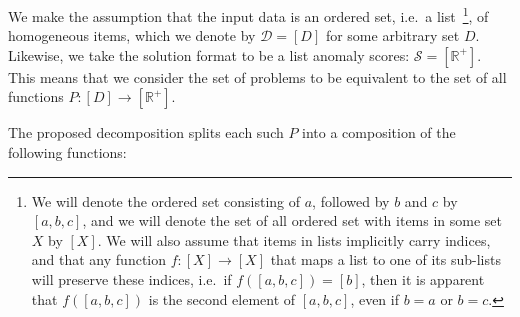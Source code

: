 We make the assumption that the input data is an ordered set, i.e.\ a list~\footnote{We will denote the ordered set consisting of $a$, followed by $b$ and $c$ by $[a, b, c]$, and we will denote the set of all ordered set with items in some set $X$ by $[X]$. We will also assume that items in lists implicitly carry indices, and that any function $f: [X] \rightarrow [X]$ that maps a list to one of its sub-lists will preserve these indices, i.e.\ if $f([a, b, c]) = [b]$, then it is apparent that $f([a, b, c])$ is the second element of $[a, b, c]$, even if $b = a$ or $b = c$.}, of homogeneous items, which we denote by $\mathcal{D} = [D]$ for some arbitrary set $D$. Likewise, we take the solution format to be a list anomaly scores: $\mathcal{S} = [\mathbb{R}^+]$. This means that we consider the set of problems to be equivalent to the set of all functions $P: [D] \rightarrow [\mathbb{R}^+]$.

The proposed decomposition splits each such $P$ into a composition of the following functions:

